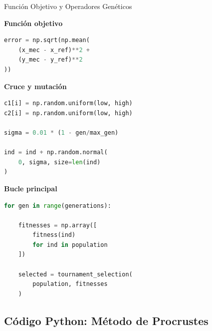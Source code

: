 \documentclass[xcolor={table,dvipsnames}]{beamer}
\begin{document}
\begin{frame}[fragile]{Funci\'on Objetivo y Operadores Gen\'eticos}

\textbf{Funci\'on objetivo}

\begin{lstlisting}[language=Python,basicstyle=\ttfamily\tiny]
error = np.sqrt(np.mean(
    (x_mec - x_ref)**2 +
    (y_mec - y_ref)**2
))
\end{lstlisting}

\vspace{0.2cm}

\textbf{Cruce y mutaci\'on}

\begin{lstlisting}[language=Python,basicstyle=\ttfamily\tiny]
c1[i] = np.random.uniform(low, high)
c2[i] = np.random.uniform(low, high)

sigma = 0.01 * (1 - gen/max_gen)

ind = ind + np.random.normal(
    0, sigma, size=len(ind)
)
\end{lstlisting}

\vspace{0.2cm}

\textbf{Bucle principal}

\begin{lstlisting}[language=Python,basicstyle=\ttfamily\tiny]
for gen in range(generations):

    fitnesses = np.array([
        fitness(ind)
        for ind in population
    ])

    selected = tournament_selection(
        population, fitnesses
    )
\end{lstlisting}

\end{frame}

\subsection{C\'odigo Python: M\'etodo de Procrustes}
\end{document}

